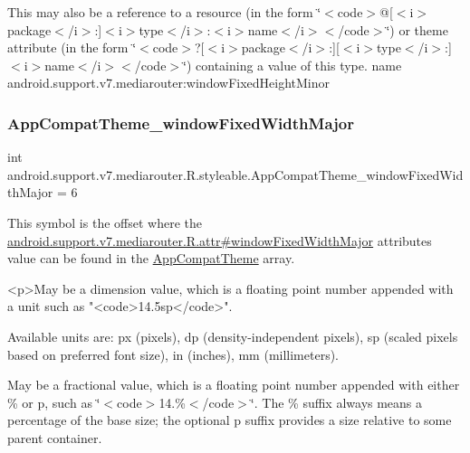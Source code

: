 This may also be a reference to a resource (in the form \char`\"{}$<$code$>$@\mbox{[}$<$i$>$package$<$/i$>$\+:\mbox{]}$<$i$>$type$<$/i$>$\+:$<$i$>$name$<$/i$>$$<$/code$>$\char`\"{}) or theme attribute (in the form \char`\"{}$<$code$>$?\mbox{[}$<$i$>$package$<$/i$>$\+:\mbox{]}\mbox{[}$<$i$>$type$<$/i$>$\+:\mbox{]}$<$i$>$name$<$/i$>$$<$/code$>$\char`\"{}) containing a value of this type.  name android.\+support.\+v7.\+mediarouter\+:window\+Fixed\+Height\+Minor \mbox{\label{classandroid_1_1support_1_1v7_1_1mediarouter_1_1R_1_1styleable_a2a286949ebf9182579df1a88e8e294d0}} 
\subsubsection{\texorpdfstring{App\+Compat\+Theme\+\_\+window\+Fixed\+Width\+Major}{AppCompatTheme\_windowFixedWidthMajor}}
{\footnotesize\ttfamily int android.\+support.\+v7.\+mediarouter.\+R.\+styleable.\+App\+Compat\+Theme\+\_\+window\+Fixed\+Width\+Major = 6\hspace{0.3cm}{\ttfamily [static]}}

This symbol is the offset where the \hyperlink{classandroid_1_1support_1_1v7_1_1mediarouter_1_1R_1_1attr_ae56e50cdd34b9aa2991748fffbe15989}{android.\+support.\+v7.\+mediarouter.\+R.\+attr\#window\+Fixed\+Width\+Major} attribute\textquotesingle{}s value can be found in the \hyperlink{classandroid_1_1support_1_1v7_1_1mediarouter_1_1R_1_1styleable_a4e3d3900c75d49aeb2f283cac00214d6}{App\+Compat\+Theme} array.

\begin{DoxyVerb}      <p>May be a dimension value, which is a floating point number appended with a unit such as "<code>14.5sp</code>".
\end{DoxyVerb}
 Available units are\+: px (pixels), dp (density-\/independent pixels), sp (scaled pixels based on preferred font size), in (inches), mm (millimeters). 

May be a fractional value, which is a floating point number appended with either \% or p, such as \char`\"{}$<$code$>$14.\%$<$/code$>$\char`\"{}. The \% suffix always means a percentage of the base size; the optional p suffix provides a size relative to some parent container. 

